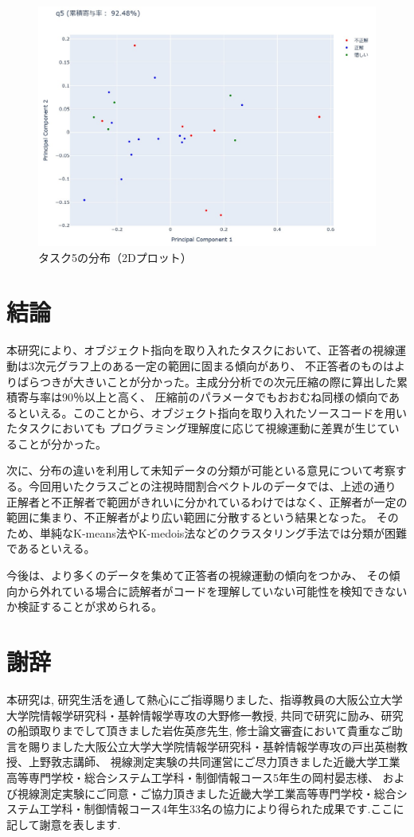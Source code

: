 \documentclass[paper=a4paper,fontsize=11pt]{jlreq}
\begin{document}
    \begin{figure}[htbp]
      \centering
      \includegraphics[width=0.8\linewidth]{2dplot_q5.jpg}
      \caption{タスク5の分布（2Dプロット）}
      \label{2dplot_q5}
    \end{figure}
    \FloatBarrier

\clearpage

\part{結論}
  本研究により、オブジェクト指向を取り入れたタスクにおいて、正答者の視線運動は3次元グラフ上のある一定の範囲に固まる傾向があり、
  不正答者のものはよりばらつきが大きいことが分かった。主成分分析での次元圧縮の際に算出した累積寄与率は90％以上と高く、
  圧縮前のパラメータでもおおむね同様の傾向であるといえる。このことから、オブジェクト指向を取り入れたソースコードを用いたタスクにおいても
  プログラミング理解度に応じて視線運動に差異が生じていることが分かった。

  次に、分布の違いを利用して未知データの分類が可能といる意見について考察する。今回用いたクラスごとの注視時間割合ベクトルのデータでは、上述の通り
  正解者と不正解者で範囲がきれいに分かれているわけではなく、正解者が一定の範囲に集まり、不正解者がより広い範囲に分散するという結果となった。
  そのため、単純なK-means法やK-medois法などのクラスタリング手法では分類が困難であるといえる。

  今後は、より多くのデータを集めて正答者の視線運動の傾向をつかみ、
  その傾向から外れている場合に読解者がコードを理解していない可能性を検知できないか検証することが求められる。

\pagebreak

\part*{謝辞}
  本研究は,
  研究生活を通して熱心にご指導賜りました、指導教員の大阪公立大学大学院情報学研究科・基幹情報学専攻の大野修一教授,
  共同で研究に励み、研究の船頭取りまでして頂きました岩佐英彦先生,
  修士論文審査において貴重なご助言を賜りました大阪公立大学大学院情報学研究科・基幹情報学専攻の戸出英樹教授、上野敦志講師、
  視線測定実験の共同運営にご尽力頂きました近畿大学工業高等専門学校・総合システム工学科・制御情報コース5年生の岡村晏志様、
  および視線測定実験にご同意・ご協力頂きました近畿大学工業高等専門学校・総合システム工学科・制御情報コース4年生33名の協力により得られた成果です.ここに記して謝意を表します.
\end{document}
